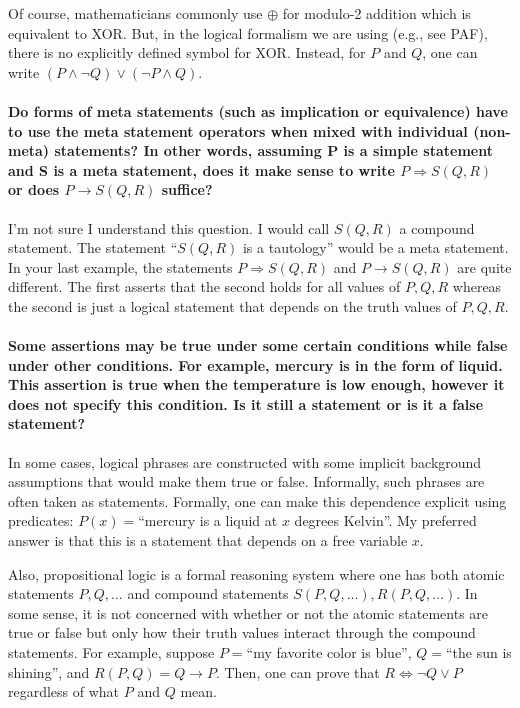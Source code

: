 \documentclass[10pt,english]{article}
\begin{document}
Of course, mathematicians commonly use $\oplus$ for modulo-2 addition which is equivalent to XOR.  But, in the logical formalism we are using (e.g., see PAF), there is no explicitly defined symbol for XOR.  Instead, for $P$ and $Q$, one can write $(P \wedge \neg Q) \vee (\neg P \wedge Q)$.

\paragraph{Do forms of meta statements (such as implication or equivalence) have to use the meta statement operators when mixed with individual (non-meta) statements? In other words, assuming P is a simple statement and S is a meta statement, does it make sense to write $P \Rightarrow S(Q,R)$ or does $P \rightarrow S(Q,R)$ suffice?}

I'm not sure I understand this question.  I would call $S(Q,R)$ a compound statement.  The statement ``$S(Q,R)$ is a tautology'' would be a meta statement.  In your last example, the statements $P \Rightarrow S(Q,R)$ and $P \rightarrow S(Q,R)$ are quite different.  The first asserts that the second holds for all values of $P,Q,R$ whereas the second is just a logical statement that depends on the truth values of $P,Q,R$.

\paragraph{Some assertions may be true under some certain conditions while false under other conditions. For example, mercury is in the form of liquid. This assertion is true when the temperature is low enough, however it does not specify this condition. Is it still a statement or is it a false statement?}

In some cases, logical phrases are constructed with some implicit background assumptions that would make them true or false.  Informally, such phrases are often taken as statements. Formally, one can make this dependence explicit using predicates: $P(x)=$``mercury is a liquid at $x$ degrees Kelvin''.  My preferred answer is that this is a statement that depends on a free variable $x$.

Also, propositional logic is a formal reasoning system where one has both atomic statements $P,Q,\ldots$ and compound statements $S(P,Q,\ldots), R(P,Q,\ldots)$.  In some sense, it is not concerned with whether or not the atomic statements are true or false but only how their truth values interact through the compound statements.  For example, suppose $P=$``my favorite color is blue'', $Q=$``the sun is shining'', and $R(P,Q) = Q \rightarrow P$.  Then, one can prove that $R \Leftrightarrow \neg Q \vee P$ regardless of what $P$ and $Q$ mean.
\end{document}
